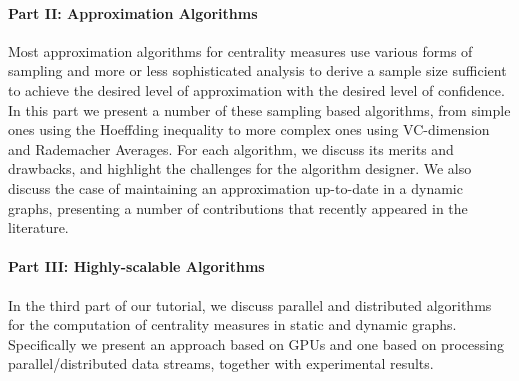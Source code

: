 \documentclass[pdfpagelabels=false]{sig-alternate-2013} %
\begin{document}
\paragraph{Part II: Approximation Algorithms}
Most approximation algorithms for centrality measures use various forms of
sampling and more or less sophisticated analysis to derive a sample size
sufficient to achieve the desired level of approximation with the desired level
of confidence. In this part we present a number of these sampling based
algorithms, from simple ones using the Hoeffding inequality to more complex ones
using VC-dimension and Rademacher Averages. For each algorithm, we discuss its
merits and drawbacks, and highlight the challenges for the algorithm designer.
We also discuss the case of maintaining an approximation up-to-date in a dynamic
graphs, presenting a number of contributions that recently appeared in the
literature.

\paragraph{Part III: Highly-scalable Algorithms}
In the third part of our tutorial, we discuss parallel and distributed
algorithms for the computation of centrality measures in static and dynamic
graphs. Specifically we present an approach based on GPUs and one based on
processing parallel/distributed data streams, together with experimental
results.
\end{document}
